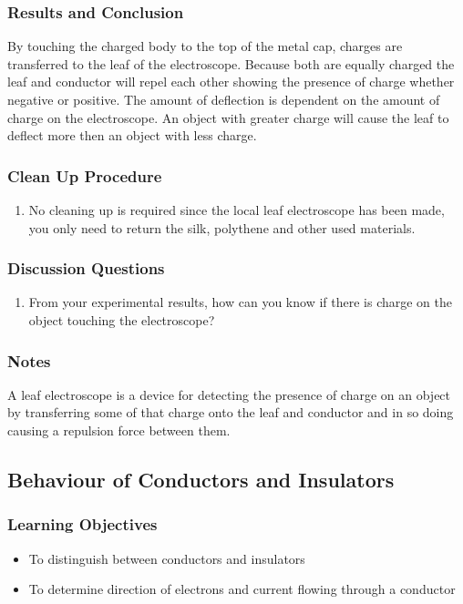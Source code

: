 \subsubsection*{Results and Conclusion}
By touching the charged body to the top of the metal cap, charges are transferred to the leaf of the electroscope. Because both are equally charged the leaf and conductor will repel each other showing the presence of charge whether negative or positive.
The amount of deflection is dependent on the amount of charge on the electroscope. An object with greater charge will cause the leaf to deflect more then an object with less charge. 

\subsubsection*{Clean Up Procedure}
\begin{enumerate}
\item{No cleaning up is required since the local leaf electroscope has been made, you only need to return the silk, polythene and other used materials.} 
\end{enumerate}

\subsubsection*{Discussion Questions}
\begin{enumerate}
\item{From your experimental results, how can you know if there is charge on the object touching the electroscope?} 
\end{enumerate}

\subsubsection*{Notes}
A leaf electroscope is a device for detecting the presence of charge on an object by transferring some of that charge onto the leaf and conductor and in so doing causing a repulsion force between them.

\subsection{Behaviour of Conductors and Insulators} 

\subsubsection*{Learning Objectives}
\begin{itemize}
\item{To distinguish between conductors and insulators} 
\item{To determine direction of electrons and current flowing through a conductor} 
\end{itemize}

